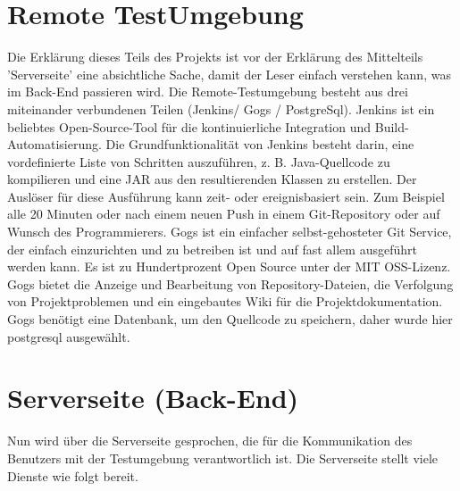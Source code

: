 \documentclass[a4paper,12pt,oneside]{book}
\begin{document}
\section{Remote TestUmgebung}
Die Erklärung dieses Teils des Projekts ist vor der Erklärung des Mittelteils 'Serverseite' eine absichtliche Sache, damit der Leser einfach verstehen kann, was im Back-End passieren wird.
\newline
Die Remote-Testumgebung besteht aus drei miteinander verbundenen Teilen (Jenkins/ Gogs / PostgreSql).
\newline
Jenkins ist ein beliebtes Open-Source-Tool für die kontinuierliche Integration und Build-Automatisierung. Die Grundfunktionalität von Jenkins besteht darin, eine vordefinierte Liste von Schritten auszuführen, z. B. Java-Quellcode zu kompilieren und eine JAR aus den resultierenden Klassen zu erstellen. Der Auslöser für diese Ausführung kann zeit- oder ereignisbasiert sein. Zum Beispiel alle 20 Minuten oder nach einem neuen Push in einem Git-Repository oder auf Wunsch des Programmierers. 
\newline
Gogs ist ein einfacher selbst-gehosteter Git Service, der einfach einzurichten und zu betreiben ist und auf fast allem ausgeführt werden kann. Es ist zu Hundertprozent Open Source unter der MIT OSS-Lizenz. Gogs bietet die Anzeige und Bearbeitung von Repository-Dateien, die Verfolgung von Projektproblemen und ein eingebautes Wiki für die Projektdokumentation.
Gogs benötigt eine Datenbank, um den Quellcode zu speichern, daher wurde hier postgresql ausgewählt.

\section{Serverseite (Back-End)}
Nun wird über die Serverseite gesprochen, die für die Kommunikation des Benutzers mit der Testumgebung verantwortlich ist.
\newline
Die Serverseite stellt viele Dienste wie folgt bereit.
\end{document}
